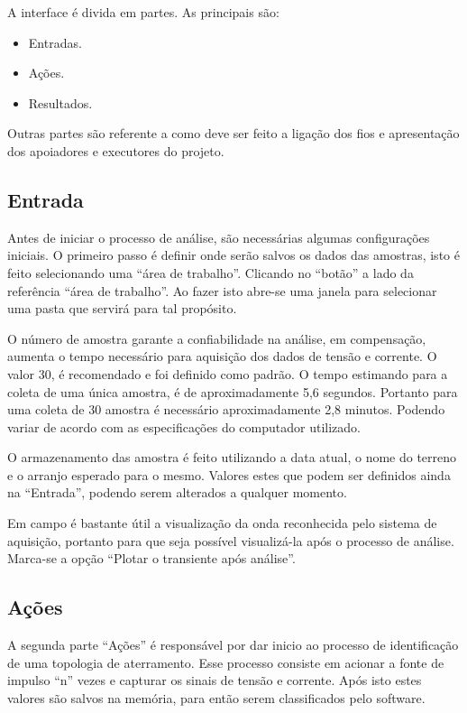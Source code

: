 \documentclass[a4paper, 10pt]{article}
\begin{document}
A interface é divida em partes. As principais são:

\begin{itemize}
    \item Entradas.
    \item Ações.
    \item Resultados.
\end{itemize}

Outras partes são referente a como deve ser feito a ligação dos fios e apresentação dos
apoiadores e executores do projeto.

\subsection{Entrada}

Antes de iniciar o processo de análise, são necessárias algumas configurações
iniciais. O primeiro passo é definir onde serão salvos os dados das amostras, 
isto é feito selecionando uma ``área de trabalho''. 
Clicando no ``botão'' a lado da referência ``área de trabalho''.
Ao fazer isto abre-se uma janela para selecionar uma pasta que 
servirá para tal propósito.





O número de amostra garante a confiabilidade na análise, em
compensação, aumenta o tempo necessário para aquisição dos dados de tensão e corrente. O valor 30, 
é recomendado e foi definido como padrão. 
O tempo estimando para a coleta de uma única amostra, é de aproximadamente 5,6 segundos. 
Portanto para uma coleta de 30 amostra é necessário aproximadamente 2,8 minutos. Podendo variar de 
acordo com as especificações do computador utilizado.

O armazenamento das amostra é feito utilizando a data atual, o nome do terreno e o arranjo esperado para 
o mesmo. Valores estes que podem ser definidos ainda na ``Entrada'', podendo serem alterados a qualquer
momento. 

Em campo é bastante útil a visualização da onda reconhecida pelo sistema de aquisição, portanto para 
que seja possível visualizá-la após o processo de análise. Marca-se a opção ``Plotar o transiente 
após análise''.

\subsection{Ações}

A segunda parte ``Ações'' é responsável por dar inicio ao processo de identificação de uma topologia
de aterramento. Esse processo consiste em acionar a fonte de impulso ``n'' vezes e capturar 
os sinais de tensão e corrente. Após isto estes valores são salvos na memória, para então serem 
classificados pelo software.
\end{document}
